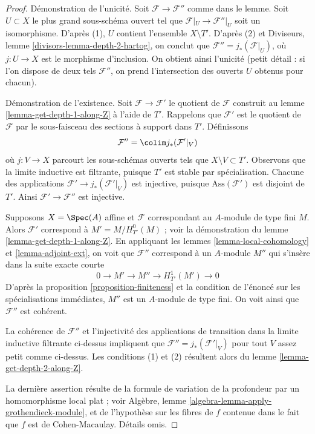 \begin{proof}
Démonstration de l'unicité. Soit $\mathcal{F} \to \mathcal{F}''$ comme dans le lemme. Soit $U \subset X$ le plus grand sous-schéma ouvert tel que $\mathcal{F}|_U \to \mathcal{F}''|_U$ soit un isomorphisme. D'après (1), $U$ contient l'ensemble $X \setminus T'$. D'après (2) et Diviseurs, lemme \ref{divisors-lemma-depth-2-hartog}, on conclut que $\mathcal{F}'' = j_*(\mathcal{F}|_U)$, où $j : U \to X$ est le morphisme d'inclusion. On obtient ainsi l'unicité (petit détail : si l'on dispose de deux tels $\mathcal{F}''$, on prend l'intersection des ouverts $U$ obtenus pour chacun).

\medskip\noindent
Démonstration de l'existence. Soit $\mathcal{F} \to \mathcal{F}'$ le quotient de $\mathcal{F}$ construit au lemme \ref{lemma-get-depth-1-along-Z} à l'aide de $T'$. Rappelons que $\mathcal{F}'$ est le quotient de $\mathcal{F}$ par le sous-faisceau des sections à support dans $T'$. Définissons
$$
\mathcal{F}'' = \colim j_*(\mathcal{F}'|_V)
$$
où $j : V \to X$ parcourt les sous-schémas ouverts tels que $X \setminus V \subset T'$. Observons que la limite inductive est filtrante, puisque $T'$ est stable par spécialisation. Chacune des applications $\mathcal{F}' \to j_*(\mathcal{F}'|_V)$ est injective, puisque $\text{Ass}(\mathcal{F}')$ est disjoint de $T'$. Ainsi $\mathcal{F}' \to \mathcal{F}''$ est injective.

\medskip\noindent
Supposons $X = \Spec(A)$ affine et $\mathcal{F}$ correspondant au $A$-module de type fini $M$. Alors $\mathcal{F}'$ correspond à $M' = M / H^0_{T'}(M)$ ; voir la démonstration du lemme \ref{lemma-get-depth-1-along-Z}. En appliquant les lemmes \ref{lemma-local-cohomology} et \ref{lemma-adjoint-ext}, on voit que $\mathcal{F}''$ correspond à un $A$-module $M''$ qui s'insère dans la suite exacte courte
$$
0 \to M' \to M'' \to H^1_{T'}(M') \to 0
$$
D'après la proposition \ref{proposition-finiteness} et la condition de l'énoncé sur les spécialisations immédiates, $M''$ est un $A$-module de type fini. On voit ainsi que $\mathcal{F}''$ est cohérent.

\medskip\noindent
La cohérence de $\mathcal{F}''$ et l'injectivité des applications de transition dans la limite inductive filtrante ci-dessus impliquent que $\mathcal{F}'' = j_*(\mathcal{F}'|_V)$ pour tout $V$ assez petit comme ci-dessus. Les conditions (1) et (2) résultent alors du lemme \ref{lemma-get-depth-2-along-Z}.

\medskip\noindent
La dernière assertion résulte de la formule de variation de la profondeur par un homomorphisme local plat ; voir Algèbre, lemme \ref{algebra-lemma-apply-grothendieck-module}, et de l'hypothèse sur les fibres de $f$ contenue dans le fait que $f$ est de Cohen-Macaulay. Détails omis.
\end{proof}

